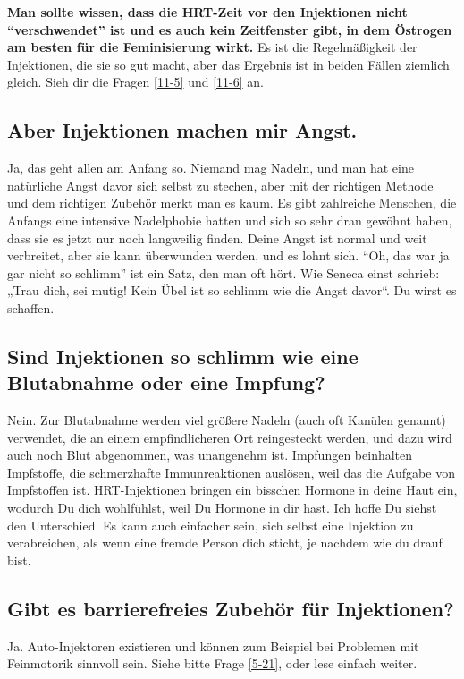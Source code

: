 \documentclass{article}
\begin{document}
{\textbf{Man sollte wissen, dass die HRT-Zeit vor den Injektionen nicht “verschwendet” ist und es auch kein Zeitfenster gibt, in dem Östrogen am besten für die Feminisierung wirkt.} Es ist die Regelmäßigkeit der Injektionen, die sie so gut macht, aber das Ergebnis ist in beiden Fällen ziemlich gleich. Sieh dir die Fragen \ref{11-5} und \ref{11-6} an.

\subsection{Aber Injektionen machen mir Angst.}

Ja, das geht allen am Anfang so. Niemand mag Nadeln, und man hat eine natürliche Angst davor sich selbst zu stechen, aber mit der richtigen Methode und dem richtigen Zubehör merkt man es kaum. Es gibt zahlreiche Menschen, die Anfangs eine intensive Nadelphobie hatten und sich so sehr dran gewöhnt haben, dass sie es jetzt nur noch langweilig finden. Deine Angst ist normal und weit verbreitet, aber sie kann überwunden werden, und es lohnt sich. “Oh, das war ja gar nicht so schlimm” ist ein Satz, den man oft hört. Wie Seneca einst schrieb: „Trau dich, sei mutig! Kein Übel ist so schlimm wie die Angst davor“. Du wirst es schaffen.

\subsection{Sind Injektionen so schlimm wie eine Blutabnahme oder eine Impfung?}

Nein. Zur Blutabnahme werden viel größere Nadeln (auch oft Kanülen genannt) verwendet, die an einem empfindlicheren Ort reingesteckt werden, und dazu wird auch noch Blut abgenommen, was unangenehm ist. Impfungen beinhalten Impfstoffe, die schmerzhafte Immunreaktionen auslösen, weil das die Aufgabe von Impfstoffen ist. HRT-Injektionen bringen ein bisschen Hormone in deine Haut ein, wodurch Du dich wohlfühlst, weil Du Hormone in dir hast. Ich hoffe Du siehst den Unterschied. Es kann auch einfacher sein, sich selbst eine Injektion zu verabreichen, als wenn eine fremde Person dich sticht, je nachdem wie du drauf bist.

\subsection{Gibt es barrierefreies Zubehör für Injektionen?}

Ja. Auto-Injektoren existieren und können zum Beispiel bei Problemen mit Feinmotorik sinnvoll sein. Siehe bitte Frage \ref{5-21}, oder lese einfach weiter.

}
\end{document}
